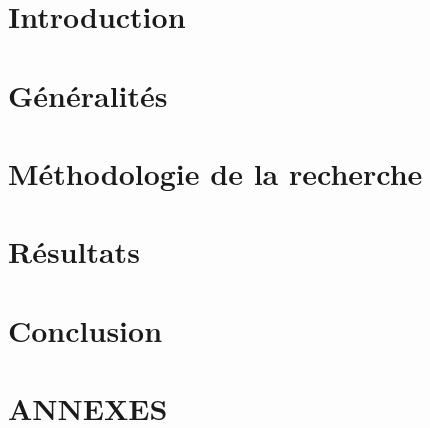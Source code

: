 \documentclass[french]{amu_these}
\begin{document}
	\ohead{\leftmark\Ifstr{\rightmark}{\leftmark}{}{ -- \rightmark}}	%

	\chapter*{Introduction}
	

	\chapter{ Généralités}
	

	\chapter{ Méthodologie de la recherche}
	

	\chapter{ Résultats}
	

	\chapter*{Conclusion}
	

	\appendix

	\newpage
	\printbibliography[					%
	heading=bibintoc
	]	
	\newpage
	\printindex							%
	\newpage
	\printendnotes						%

	\setcounter{chapter}{0}
	\renewcommand{\thesection}{\Alph{section}}
	
	\chapter*{ANNEXES}
	\newpage
	
	
	\newpage
	
\end{document}
